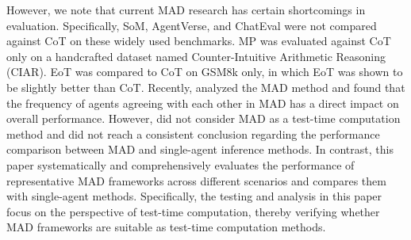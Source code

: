 However, we note that current MAD research has certain shortcomings in evaluation. Specifically, SoM, AgentVerse, and ChatEval were not compared against CoT on these widely used benchmarks. MP was evaluated against CoT only on a handcrafted dataset named Counter-Intuitive Arithmetic Reasoning (CIAR). EoT was compared to CoT on GSM8k only, in which EoT was shown to be slightly better than CoT. Recently, \cite{smit2023we} analyzed the MAD method and found that the frequency of agents agreeing with each other in MAD has a direct impact on overall performance. However, \cite{smit2023we} did not consider MAD as a test-time computation method and did not reach a consistent conclusion regarding the performance comparison between MAD and single-agent inference methods. In contrast, this paper systematically and comprehensively evaluates the performance of representative MAD frameworks across different scenarios and compares them with single-agent methods. Specifically, the testing and analysis in this paper focus on the perspective of test-time computation, thereby verifying whether MAD frameworks are suitable as test-time computation methods.